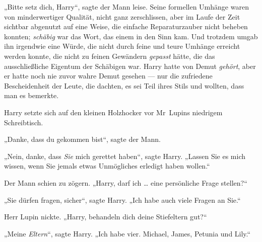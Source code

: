 „Bitte setz dich, Harry“, sagte der Mann leise. Seine formellen Umhänge waren von minderwertiger Qualität, nicht ganz zerschlissen, aber im Laufe der Zeit sichtbar abgenutzt auf eine Weise, die einfache Reparaturzauber nicht beheben konnten; \emph{schäbig} war das Wort, das einem in den Sinn kam. Und trotzdem umgab ihn irgendwie eine Würde, die nicht durch feine und teure Umhänge erreicht werden konnte, die nicht zu feinen Gewändern \emph{gepasst} hätte, die das ausschließliche Eigentum der Schäbigen war. Harry hatte von Demut \emph{gehört}, aber er hatte noch nie zuvor wahre Demut gesehen — nur die zufriedene Bescheidenheit der Leute, die dachten, es sei Teil ihres Stils und wollten, dass man es bemerkte.

Harry setzte sich auf den kleinen Holzhocker vor Mr~Lupins niedrigem Schreibtisch.

„Danke, dass du gekommen bist“, sagte der Mann.

„Nein, danke, dass \emph{Sie} mich gerettet haben“, sagte Harry.
„Lassen Sie es mich wissen, wenn Sie jemals etwas Unmögliches erledigt haben wollen.“

Der Mann schien zu zögern.
„Harry, darf ich … eine persönliche Frage stellen?“

„Sie dürfen fragen, sicher“, sagte Harry.
„Ich habe auch viele Fragen an Sie.“

Herr Lupin nickte.
„Harry, behandeln dich deine Stiefeltern gut?“

„Meine \emph{Eltern}“, sagte Harry.
„Ich habe vier. Michael, James, Petunia und Lily.“

